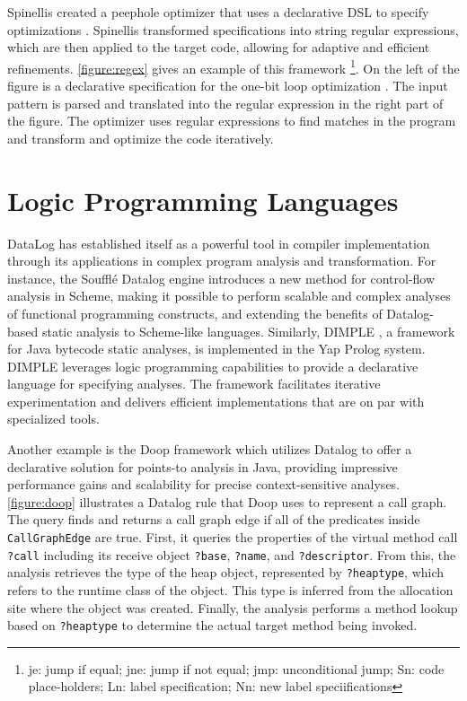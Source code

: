 Spinellis created a peephole optimizer that uses a declarative DSL to specify optimizations \cite{Spinellis1999}. Spinellis transformed specifications into string regular expressions, which are then applied to the target code, allowing for adaptive and efficient refinements.
\autoref{figure:regex} gives an example of this framework
\footnote{je: jump if equal; jne: jump if not equal; jmp: unconditional jump; Sn: code place-holders; Ln: label specification; Nn: new label speciifications}. 
On the left of the figure is a declarative specification for the one-bit loop optimization \cite{Spinellis1999}. The input pattern is parsed and translated into the regular expression in the right part of the figure. The optimizer uses regular expressions to find matches in the program and transform and optimize the code iteratively.

\section{Logic Programming Languages}
DataLog has established itself as a powerful tool in compiler implementation through its applications in complex program analysis and transformation. 
For instance, the Soufflé Datalog engine \cite{silverman2021wantanalyzeschemeprograms} introduces a new method for control-flow analysis in Scheme, making it possible to perform scalable and complex analyses of functional programming constructs, and extending the benefits of Datalog-based static analysis to Scheme-like languages. Similarly, DIMPLE \cite{Benton2007}, a framework for Java bytecode static analyses, is implemented in the Yap Prolog system. DIMPLE leverages logic programming capabilities to provide a declarative language for specifying analyses. The framework facilitates iterative experimentation and delivers efficient implementations that are on par with specialized tools. 

Another example is the Doop framework \cite{Bravenboer2009} which utilizes Datalog to offer a declarative solution for points-to analysis in Java, providing impressive performance gains and scalability for precise context-sensitive analyses. \autoref{figure:doop} illustrates a Datalog rule that Doop uses to represent a call graph. The query finds and returns a call graph edge if all of the predicates inside \texttt{CallGraphEdge} are true. First, it queries the properties of the virtual method call \texttt{?call} including its receive object \texttt{?base}, \texttt{?name}, and \texttt{?descriptor}. From this, the analysis retrieves the type of the heap object, represented by \texttt{?heaptype}, which refers to the runtime class of the object. This type is inferred from the allocation site where the object was created. Finally, the analysis performs a method lookup based on \texttt{?heaptype} to determine the actual target method being invoked.


